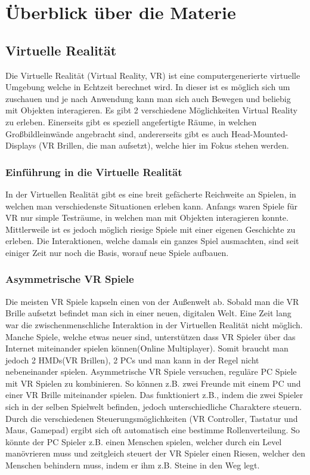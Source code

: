 \chapter{Überblick über die Materie}
\section{Virtuelle Realität}
Die Virtuelle Realität (Virtual Reality, VR) ist eine computergenerierte virtuelle Umgebung welche in Echtzeit berechnet wird. In dieser ist es möglich sich um zuschauen und je nach Anwendung kann man sich auch Bewegen und beliebig mit Objekten interagieren. Es gibt 2 verschiedene Möglichkeiten Virtual Reality zu erleben. Einerseits gibt es speziell angefertigte Räume, in welchen Großbildleinwände angebracht sind, andererseits gibt es auch Head-Mounted-Displays (VR Brillen,  die man aufsetzt), welche hier im Fokus stehen werden.


\subsection{Einführung in die Virtuelle Realität}
In der Virtuellen Realität gibt es eine breit gefächerte Reichweite an Spielen, in welchen man verschiedenste Situationen erleben kann. Anfangs waren Spiele für VR nur simple Testräume, in welchen man mit Objekten interagieren konnte. Mittlerweile ist es jedoch möglich riesige Spiele mit einer eigenen Geschichte zu erleben. Die Interaktionen, welche damals ein ganzes Spiel ausmachten, sind seit einiger Zeit nur noch die Basis, worauf neue Spiele aufbauen.

\subsection{Asymmetrische VR Spiele}
Die meisten VR Spiele kapseln einen von der Außenwelt ab. Sobald man die VR Brille aufsetzt befindet man sich in einer neuen, digitalen Welt. Eine Zeit lang war die zwischenmenschliche Interaktion in der Virtuellen Realität nicht möglich. Manche Spiele, welche etwas neuer sind, unterstützen dass VR Spieler über das Internet miteinander spielen können(Online Multiplayer). Somit braucht man jedoch 2 HMDs(VR Brillen), 2 PCs und man kann in der Regel nicht nebeneinander spielen. Asymmetrische VR Spiele versuchen, reguläre PC Spiele mit VR Spielen zu kombinieren. So können z.B. zwei Freunde mit einem PC und einer VR Brille miteinander spielen. Das funktioniert z.B., indem die zwei Spieler sich in der selben Spielwelt befinden, jedoch unterschiedliche Charaktere steuern. Durch die verschiedenen Steuerungsmöglichkeiten (VR Controller, Tastatur und Maus, Gamepad) ergibt sich oft automatisch eine bestimme Rollenverteilung. So könnte der PC Spieler z.B. einen Menschen spielen, welcher durch ein Level manövrieren muss und zeitgleich steuert der VR Spieler einen Riesen, welcher den Menschen behindern muss, indem er ihm z.B. Steine in den Weg legt.  

